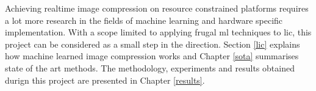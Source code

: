 Achieving realtime image compression on resource constrained platforms requires a lot more research in the fields of machine learning and hardware specific implementation. With a scope limited to applying frugal \acrshort{ml} techniques to \acrshort{lic}, this project can be considered as a small step in the direction. Section \ref{lic} explains how machine learned image compression works and Chapter \ref{sota} summarises state of the art methods. The methodology, experiments and results obtained durign this project are presented in Chapter \ref{results}. 